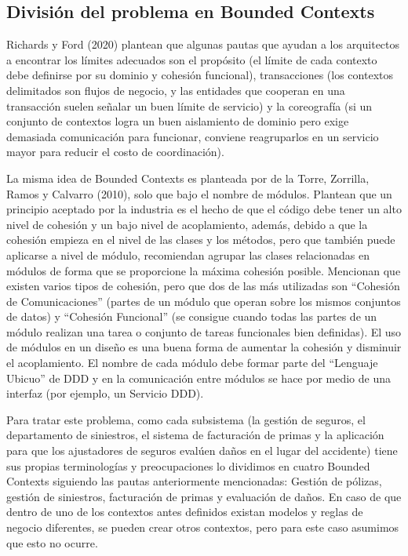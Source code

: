 \documentclass[12pt, a4paper]{article}
\begin{document}
        \subsection{División del problema en Bounded Contexts}
        
        Richards y Ford (2020) plantean que algunas pautas que ayudan a los arquitectos a encontrar los límites adecuados son el propósito (el límite de cada contexto debe definirse por su dominio y cohesión funcional), transacciones (los contextos delimitados son flujos de negocio, y las entidades que cooperan en una transacción suelen señalar un buen límite de servicio) y la coreografía (si un conjunto de contextos logra un buen aislamiento de dominio pero exige demasiada comunicación para funcionar, conviene reagruparlos en un servicio mayor para reducir el costo de coordinación).

        La misma idea de Bounded Contexts es planteada por de la Torre, Zorrilla, Ramos y Calvarro (2010), solo que bajo el nombre de módulos. Plantean que un principio aceptado por la industria es el hecho de que el código debe tener un alto nivel de cohesión y un bajo nivel de acoplamiento, además, debido a que la cohesión empieza en el nivel de las clases y los métodos, pero que también puede aplicarse a nivel de módulo, recomiendan agrupar las clases relacionadas en módulos de forma que se proporcione la máxima cohesión posible. Mencionan que existen varios tipos de cohesión, pero que dos de las más utilizadas son ``Cohesión de Comunicaciones'' (partes de un módulo que operan sobre los mismos conjuntos de datos) y ``Cohesión Funcional'' (se consigue cuando todas las partes de un módulo realizan una tarea o conjunto de tareas funcionales bien definidas). El uso de módulos en un diseño es una buena forma de aumentar la cohesión y disminuir el acoplamiento. El nombre de cada módulo debe formar parte del ``Lenguaje Ubicuo'' de DDD y en la comunicación entre módulos se hace por medio de una interfaz (por ejemplo, un Servicio DDD).

        Para tratar este problema, como cada subsistema (la gestión de seguros, el departamento de siniestros, el sistema de facturación de primas y la aplicación para que los ajustadores de seguros evalúen daños en el lugar del accidente) tiene sus propias terminologías y preocupaciones lo dividimos en cuatro Bounded Contexts siguiendo las pautas anteriormente mencionadas: Gestión de pólizas, gestión de siniestros, facturación de primas y evaluación de daños. En caso de que dentro de uno de los contextos antes definidos existan modelos y reglas de negocio diferentes, se pueden crear otros contextos, pero para este caso asumimos que esto no ocurre.
\end{document}
